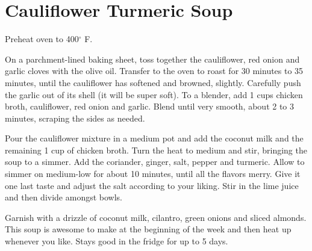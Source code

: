 \section{Cauliflower Turmeric Soup}
\begin{recipe}
	
	
	
    Preheat oven to 400$^{\circ}$ F.
    
    On a parchment-lined baking sheet, toss together the cauliflower, red onion and garlic cloves with the olive oil. Transfer to the oven to roast for 30 minutes to 35 minutes, until the cauliflower has softened and browned, slightly. Carefully push the garlic out of its shell (it will be super soft). To a blender, add 1  cups chicken broth, cauliflower, red onion and garlic. Blend until very smooth, about 2 to 3 minutes, scraping the sides as needed. 

	Pour the cauliflower mixture in a medium pot and add the coconut milk and the remaining 1 cup of chicken broth. Turn the heat to medium and stir, bringing the soup to a simmer. Add the coriander, ginger, salt, pepper and turmeric. Allow to simmer on medium-low for about 10 minutes, until all the flavors merry. Give it one last taste and adjust the salt according to your liking. Stir in the lime juice and then divide amongst bowls. 
	
	Garnish with a drizzle of coconut milk, cilantro, green onions and sliced almonds. This soup is awesome to make at the beginning of the week and then heat up whenever you like. Stays good in the fridge for up to 5 days.
	
\end{recipe}
